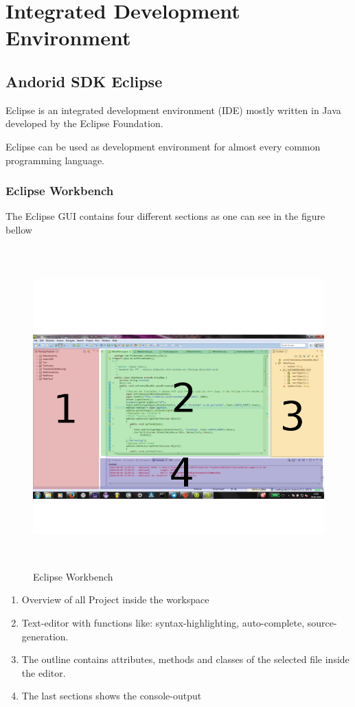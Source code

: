 \chapter{Integrated Development Environment}


\section{Andorid SDK Eclipse}

Eclipse is an integrated development environment (IDE) mostly written in Java developed by the Eclipse Foundation.

Eclipse can be used as development environment for almost every common programming language. 

\subsection{Eclipse Workbench}
The Eclipse GUI contains four different sections as one can see in the figure bellow 
\begin{figure}[H]
\centering
\includegraphics[width=400pt,height=350pt,keepaspectratio]{graphics/eclipse.png}
\caption{Eclipse Workbench}
\end{figure}

\begin{enumerate}
\item Overview of all Project inside the workspace
\item Text-editor with functions like: syntax-highlighting, auto-complete, source-generation.
\item The outline contains attributes, methods and classes of the selected file inside the editor. 
\item The last sections shows the console-output     
\end{enumerate}

